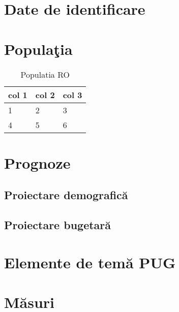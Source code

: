 \documentclass[11pt,a4paper]{scrartcl}
\begin{document}



\section{Date de identificare}

\begin{flushleft}


\end{flushleft}


\section{Populaţia}

\begin{table}[ht]
\begin{tabular}{lll}
\rowcolor{gray!40}
col 1 & col 2 & col 3 \\ \hline
1 & 2 & 3 \\
4 & 5 & 6 \\ \hline
\end{tabular}
\caption{Populatia RO}
\end{table}

\section{Prognoze}


\subsection{Proiectare demografică}


\subsection{Proiectare bugetară}


\section{Elemente de temă PUG}


\section{Măsuri}
\end{document}
